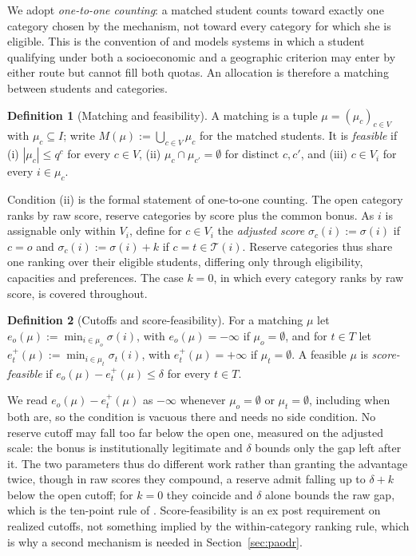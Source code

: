 \documentclass[a4paper,twoside]{article}
\theoremstyle{definition}
\newtheorem{definition}{Definition}
\renewcommand{\T}{\mathcal{T}}
\begin{document}
We adopt \emph{one-to-one counting}: a matched student counts toward exactly one category chosen by the mechanism, not toward every category for which she is eligible. This is the convention of \cite{KHIY17a,AyBo21a,GKK+17a} and models systems in which a student qualifying under both a socioeconomic and a geographic criterion may enter by either route but cannot fill both quotas. An allocation is therefore a matching between students and categories.

\begin{definition}[Matching and feasibility]
A matching is a tuple $\mu=(\mu_c)_{c\in V}$ with $\mu_c\subseteq I$; write $M(\mu):=\bigcup_{c\in V}\mu_c$ for the matched students. It is \emph{feasible} if (i) $|\mu_c|\le q^c$ for every $c\in V$, (ii) $\mu_c\cap\mu_{c'}=\emptyset$ for distinct $c,c'$, and (iii) $c\in V_i$ for every $i\in\mu_c$.
\end{definition}

Condition (ii) is the formal statement of one-to-one counting. The open category ranks by raw score, reserve categories by score plus the common bonus. As $i$ is assignable only within $V_i$, define for $c\in V_i$ the \emph{adjusted score} $\sigma_c(i):=\sigma(i)$ if $c=o$ and $\sigma_c(i):=\sigma(i)+k$ if $c=t\in\T(i)$. Reserve categories thus share one ranking over their eligible students, differing only through eligibility, capacities and preferences. The case $k=0$, in which every category ranks by raw score, is covered throughout.

\begin{definition}[Cutoffs and score-feasibility]
\label{def:scorefeas}
For a matching $\mu$ let $e_o(\mu):=\min_{i\in\mu_o}\sigma(i)$, with $e_o(\mu)=-\infty$ if $\mu_o=\emptyset$, and for $t\in T$ let $e_t^+(\mu):=\min_{i\in\mu_t}\sigma_t(i)$, with $e_t^+(\mu)=+\infty$ if $\mu_t=\emptyset$. A feasible $\mu$ is \emph{score-feasible} if $e_o(\mu)-e_t^+(\mu)\le\delta$ for every $t\in T$.
\end{definition}

We read $e_o(\mu)-e_t^+(\mu)$ as $-\infty$ whenever $\mu_o=\emptyset$ or $\mu_t=\emptyset$, including when both are, so the condition is vacuous there and needs no side condition. No reserve cutoff may fall too far below the open one, measured on the adjusted scale: the bonus is institutionally legitimate and $\delta$ bounds only the gap left after it. The two parameters thus do different work rather than granting the advantage twice, though in raw scores they compound, a reserve admit falling up to $\delta+k$ below the open cutoff; for $k=0$ they coincide and $\delta$ alone bounds the raw gap, which is the ten-point rule of \cite{AyTu23b}. Score-feasibility is an ex post requirement on realized cutoffs, not something implied by the within-category ranking rule, which is why a second mechanism is needed in Section~\ref{sec:paodr}.
\end{document}
